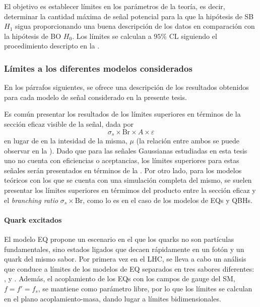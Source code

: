 El objetivo es establecer límites en los parámetros de la teoría, es decir, determinar la cantidad máxima de señal potencial para la que la hipótesis de \ac{SB} \(H_1\) sigua proporcionando una buena descripción de los datos en comparación con la hipótesis de \ac{BO} \(H_0\). Los límites se calculan a \(95\%\) \ac{CL} siguiendo el procedimiento descripto en la \Sect{\ref{subsec:strategy:stat_treatment:hypo_test}}.


\subsubsection{Límites a los diferentes modelos considerados}
\label{subsubsec:results:results:bkgsig:results}

En los párrafos siguientes, se ofrece una descripción de los resultados obtenidos para cada modelo de señal considerado en la presente tesis.

Es común presentar los resultados de los límites superiores en términos de la sección eficaz visible de la señal, dada por
\begin{equation}
    \label{eq:results:results:bkgsig:results:visible_xs}
    \sigma_s \times \text{Br} \times A \times \varepsilon
\end{equation}
en lugar de en la intesidad de la misma, \(\mu\) (la relación entre ambos se puede observar en la \Eqn{\ref{eq:strategy:stat_treatment:stat_model:mu_si}}).
Dado que para las señales Gaussianas estudiadas en esta tesis uno no cuenta con eficiencias o aceptancias, los límites superiores para estas señales serán presentados en términos de la \Eqn{\ref{eq:results:results:bkgsig:results:visible_xs}}. Por otro lado, para los modelos teóricos con los que se cuenta con una simulación completa del mismo, se suelen presentar los límites superiores en térmimos del producto entre la sección eficaz y el \textit{branching ratio} \(\sigma_s \times \text{Br}\), como lo es en el caso de los modelos de \acp{EQ} y \acp{QBH}.


\paragraph{Quark excitados}
\label{paragraph:results:results:bkgsig:results:qstar}

El modelo \ac{EQ} propone un escenario en el que los quarks no son partículas fundamentales, sino estados ligados que decaen rápidamente en un fotón y un quark del mismo sabor. Por primera vez en el \ac{LHC}, se lleva a cabo un análisis que conduce a límites de los modelos de \ac{EQ} separados en tres sabores diferentes: \qstar, \cstar y \bstar.
Además, el acoplamiento de los \acp{EQ} con los campos de gauge del \ac{SM}, \(f=f'=f_s\), se mantiene como parámetro libre, por lo que los límites se calculan en el plano acoplamiento-masa, dando lugar a límites bidimensionales.


